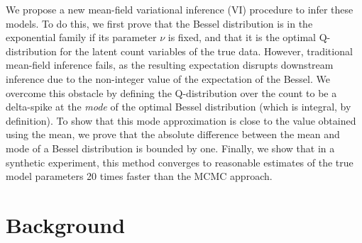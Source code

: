 \documentclass[letterpaper]{article}
\newcommand{\Gqnot}[2]{\mathbbm{G}_{Q_{\backslash #1}}\left[#2\right]}
\begin{document}
  We propose a new mean-field variational inference (VI) procedure to infer
  these models. To do this, we first prove that the Bessel distribution is in
  the exponential family if its parameter $\nu$ is fixed, and that it is the
  optimal Q-distribution for the latent count variables of the true data.
  However, traditional mean-field inference fails, as the resulting expectation
  disrupts downstream inference due to the non-integer value of the expectation
  of the Bessel. We overcome this obstacle by defining the Q-distribution over
  the count to be a delta-spike at the \emph{mode} of the optimal Bessel
  distribution (which is integral, by definition). To show that this mode
  approximation is close to the value obtained using the mean, we prove that the
  absolute difference between the mean and mode of a Bessel distribution is
  bounded by one. Finally, we show that in a synthetic experiment, this method
  converges to reasonable estimates of the true model parameters 20 times faster
  than the MCMC approach.
  
  \section{Background}
  
\end{document}
